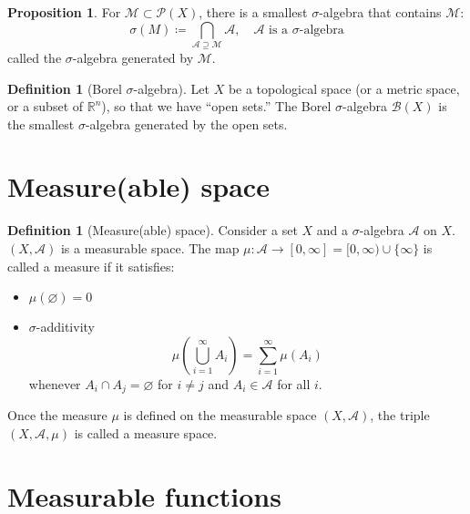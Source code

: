 \documentclass{article}
\theoremstyle{definition}
\newcommand{\lp}{\left(}
\newcommand{\rp}{\right)}
\theoremstyle{theorem}
\newtheorem{definition}[theorem]{Definition}
\newtheorem{proposition}[theorem]{Proposition}
\begin{document}
\begin{proposition}
For $\mathcal{M} \subset \mathcal{P}(X)$, there is a smallest $\sigma$-algebra that contains $\mathcal{M}$:
\begin{equation*}
    \sigma(M) \coloneqq  \bigcap_{\mathcal{A}\supseteq \mathcal{M}} \mathcal{A}, \quad \mathcal{A} \text{ is a $\sigma$-algebra}
\end{equation*}
called the $\sigma$-algebra generated by $\mathcal{M}$. 
\end{proposition}
\begin{definition}[Borel $\sigma$-algebra]
Let $X$ be a topological space (or a metric space, or a subset of $\mathbb{R}^n$), so that we have ``open sets.'' The Borel $\sigma$-algebra $\mathcal{B}(X)$ is the smallest $\sigma$-algebra generated by the open sets.
\end{definition}









\section{Measure(able) space}

\begin{definition}[Measure(able) space]
Consider a set $X$ and a $\sigma$-algebra $\mathcal{A}$ on $X$. $(X, \mathcal{A})$ is a measurable space. The map $\mu : \mathcal{A} \to [0,\infty] = [0,\infty) \cup \{ \infty\}$ is called a measure if it satisfies:
\begin{itemize}
    \item $\mu(\varnothing) = 0$
    \item $\sigma$-additivity
    \begin{equation*}
        \mu \lp \bigcup^\infty_{i=1} A_i \rp = \sum^\infty_{i=1} \mu(A_i)
    \end{equation*}
    whenever $A_i \cap A_j = \varnothing$ for $i \neq j$ and $A_i \in \mathcal{A}$ for all $i$. 
\end{itemize}
Once the measure $\mu$ is defined on the measurable space $(X,\mathcal{A})$, the triple $(X,\mathcal{A},\mu)$ is called a measure space.  
\end{definition}





\section{Measurable functions}
\end{document}
